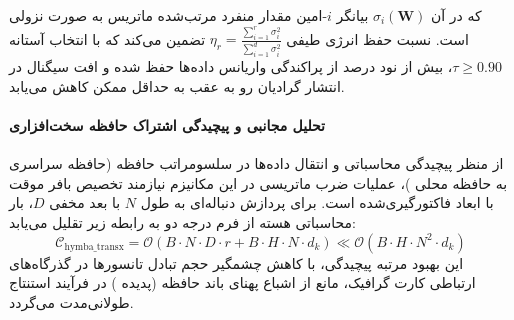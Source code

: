 
که در آن $\sigma_i(\mathbf{W})$ بیانگر $i$-امین مقدار منفرد مرتب‌شده ماتریس به صورت نزولی است. نسبت حفظ انرژی طیفی $\eta_r = \frac{\sum_{i=1}^r \sigma_i^2}{\sum_{i=1}^{d} \sigma_i^2}$ تضمین می‌کند که با انتخاب آستانه $\tau \ge 0.90$، بیش از نود درصد از پراکندگی واریانس داده‌ها حفظ شده و افت سیگنال در انتشار گرادیان رو به عقب به حداقل ممکن کاهش می‌یابد.

\paragraph{تحلیل مجانبی و پیچیدگی اشتراک حافظه سخت‌افزاری}
از منظر پیچیدگی محاسباتی و انتقال داده‌ها در سلسومراتب حافظه (حافظه سراسری  به حافظه محلی )، عملیات ضرب ماتریسی در این مکانیزم نیازمند تخصیص بافر موقت با ابعاد فاکتورگیری‌شده است. برای پردازش دنباله‌ای به طول $N$ با بعد مخفی $D$، بار محاسباتی هسته از فرم درجه دو به رابطه زیر تقلیل می‌یابد:
\begin{equation}
\label{eq:complexity_hymba_transx}
\mathcal{C}_{\text{hymba\_transx}} = \mathcal{O}\left( B \cdot N \cdot D \cdot r + B \cdot H \cdot N \cdot d_k \right) \ll \mathcal{O}\left( B \cdot H \cdot N^2 \cdot d_k \right)
\end{equation}
این بهبود مرتبه پیچیدگی، با کاهش چشمگیر حجم تبادل تانسورها در گذرگاه‌های ارتباطی کارت گرافیک، مانع از اشباع پهنای باند حافظه (پدیده ) در فرآیند استنتاج طولانی‌مدت می‌گردد.